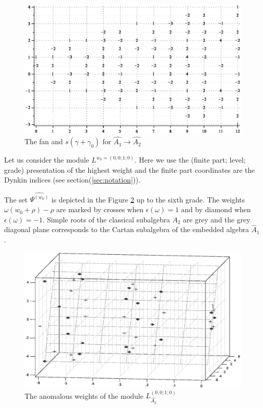 \documentclass[12pt]{iopart}
\theoremstyle{definition}
\theoremstyle{definition}
\theoremstyle{definition}
\theoremstyle{definition}
\begin{document}
\begin{figure}[h!bt]
  \centering
  \includegraphics[width=135mm]{figure6.eps}
  \caption{The fan and $s(\gamma+\gamma_0)$ for $\hat{A_1}\longrightarrow \hat{A_2}$}
  \label{fig:AffineA2A1Fan}
\end{figure}

Let us consider the module $L^{w_0=(0,0;1;0)}$. Here we use the (finite part; level; grade)
presentation of the highest weight and the finite part
coordinates are the Dynkin indices (see section(\ref{sec:notation})).

The set $\widehat{\Psi^{(w_0)}}$  is depicted in the Figure
\ref{fig:affine_A2_anom_point} up to the sixth grade.
The weights $\omega (w_0+\rho)-\rho$ are marked by crosses when $\epsilon(\omega)=1$ and
by diamond when $\epsilon(\omega)=-1$. Simple roots of the classical subalgebra $A_2$ are
grey and the grey diagonal plane corresponds to the Cartan subalgebra of
the embedded algebra $\hat{A}_1$.

\begin{figure}[h!tb]
  \includegraphics[width=140mm]{figure7.eps}
  \caption{The anomalous weights of the module $L^{(0,0;1;0)}_{\hat{A_2}}$}
  \label{fig:affine_A2_anom_point}
\end{figure}
\end{document}
